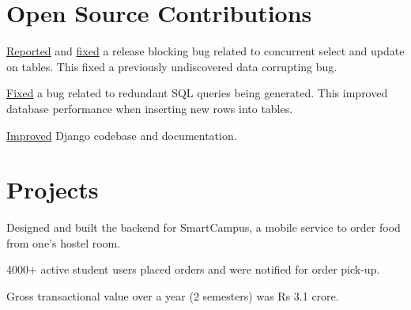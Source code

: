 \documentclass[]{resume}
\begin{document}
\begin{minipage}[t]{0.70\textwidth}
\section{Open Source Contributions}
\vspace{2pt}
\vspace{1pt}
\begin{tightemize}
\item \href{https://code.djangoproject.com/ticket/31246}{Reported} and \href{https://github.com/django/django/pull/12434}{fixed}
a release blocking bug related to concurrent select and update on tables. This fixed a previously undiscovered data corrupting bug.
\item \justifying\href{https://github.com/django/django/pull/12496}{Fixed} a bug related to redundant SQL queries being generated.
This improved database performance when inserting new rows into tables.
\item \justifying \href{https://github.com/django/django/pulls?q=author\%3Aabhijeetviswa}{Improved} Django codebase and documentation.
\end{tightemize}
\subsectionsep

\section{Projects}
\vspace{2pt}
\vspace{2pt}
\begin{tightemize}
 \item Designed and built the backend for SmartCampus, a mobile service to order food from one's hostel room.
 \item 4000+ active student users placed orders and were notified for order pick-up.
 \item Gross transactional value over a year (2 semesters) was Rs 3.1 crore.
\end{tightemize}
\subsectionsep


\end{minipage}
\end{document}
